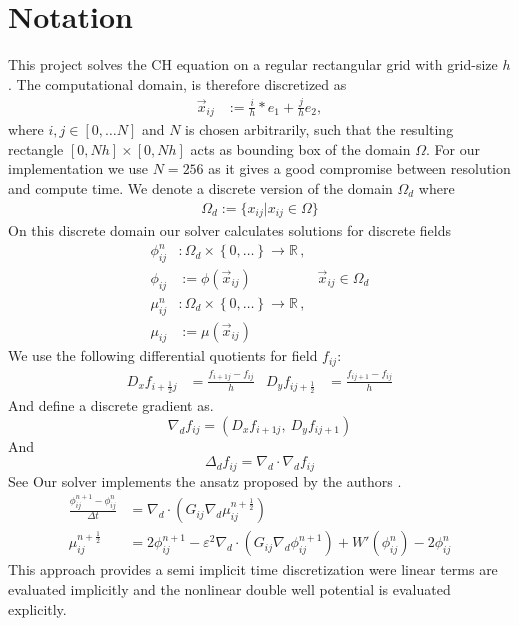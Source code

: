 \documentclass{mimosis}
\begin{document}
\section{Notation}
\label{sec:org40c28ac}
This project solves the CH equation on a regular rectangular grid with grid-size \(h\). The computational domain, is therefore discretized as
\begin{align}
\label{eq:4}
\vec{x}_{ij} &:= \frac{i}{h} * e_{1} + \frac{j}{h} e_2,
\end{align}
where \(i,j \in [0 , \dots N]\) and \(N\) is chosen arbitrarily, such that the resulting rectangle \([0 , Nh] \times [0,Nh]\) acts as bounding box of the domain \(\Omega\). For our implementation we use \(N=256\) as it gives a good compromise between resolution and compute time. We denote a discrete version of the domain \(\Omega_d\) where
\begin{align}
\label{eq:8}
\Omega_d := \{x_{ij} | x_{ij} \in \Omega\}
\end{align}
On this discrete domain our solver calculates solutions for discrete fields
\begin{align}
\label{eq:5}
\phi_{ij}^n &: \Omega_d \times \left\{ 0, \dots  \right\} \to \mathbb{R} \,,\\
\phi_{ij} &:= \phi(\vec{x}_{ij}) & \vec{x}_{ij} \in \Omega_{d} \\
\mu_{ij}^n &: \Omega_d \times \left\{ 0, \dots \right\} \to \mathbb{R} \,, \\
\mu_{ij} &:= \mu(\vec{x}_{ij})
\end{align}
We use the following differential quotients for field \(f_{ij}\):
\begin{align}
D_xf_{i+\frac{1}{2} j} &= \frac{f_{i+1j} - f_{ij}}{h} & D_yf_{ij+\frac{1}{2}} &= \frac{f_{ij+1} - f_{ij}}{h}
\end{align}
And define a discrete gradient as.
\begin{equation}
\nabla_d f_{ij} = (D_x f_{i+1j} , \ D_y f_{ij+1})
\end{equation}
And
\begin{equation}
\Delta_d f_{ij} =  \nabla_{d} \cdot \nabla_d f_{ij}
\end{equation}
See \autocite{Ulmer_CHRelaxed_2024}
Our solver implements the ansatz proposed by the authors \autocite{SHIN20117441}.
\begin{equation}
\label{eq:ansatz}
\begin{aligned}
\frac{\phi_{ij}^{n+1} - \phi_{ij}^n}{\Delta t}  &=  \nabla _d \cdot (G_{ij} \nabla_d \mu_{ij}^{n+\frac{1}{2}} )  \\
 \mu_{ij}^{n+\frac{1}{2}} &= 2\phi_{ij}^{n+1} - \varepsilon^2  \nabla_d \cdot  (G_{ij} \nabla _d \phi_{ij}^{n+1} ) + W'(\phi_{ij}^n) - 2\phi _{ij}^n
\end{aligned}
\end{equation}
This approach provides a semi implicit time discretization were linear terms are evaluated implicitly and the nonlinear double well potential is evaluated explicitly.
\end{document}
